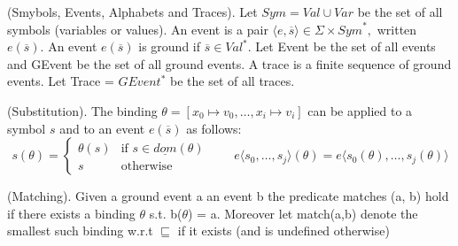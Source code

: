 				
				
				\begin{dfn}
					(Smybols, Events, Alphabets and Traces).
					Let $\mathit{Sym} = \mathit{Val} \cup \mathit{Var}$ be the set of all symbols (variables or values).
					An event is a pair $\langle e, \overline{s} \rangle \in \Sigma \times \mathit{Sym}^\ast,$ written $e(\overline{s})$.
					An event $e(\overline{s})$ is ground if $\overline{s} \in \mathit{Val}^\ast$.
					Let Event be the set of all events and GEvent be the set of all ground events.
					A trace is a finite sequence of ground events.
					Let Trace = $GEvent^\ast$ be the set of all traces\citep{qea}. 
				\end{dfn}
				
				\begin{dfn}
					(Substitution).
					The binding $\theta = [x_0 \mapsto v_0, \dots, x_i \mapsto v_i]$ can be applied to a symbol $s$ and to an event
					$e(\overline{s})$ as follows: 
					\[
					 s(\theta) = 
					  \begin{cases} 
					   \theta(s) & \text{if } s \in \underline{dom}(\theta) \\
					   s & \text{otherwise}
					  \end{cases}
					  \qquad e \langle s_0,\ldots,s_j \rangle (\theta) = e \langle s_0(\theta),\ldots,s_j(\theta) \rangle
					\]
				\end{dfn}
				
				\begin{dfn}
					(Matching).
					Given a ground event a an event b the predicate matches (a, b) hold if there exists a binding $\theta$ s.t. b($\theta$) = a.
					Moreover let match(a,b) denote the smallest such binding w.r.t $\sqsubseteq$ if it exists (and is undefined otherwise)
				\end{dfn}
				
